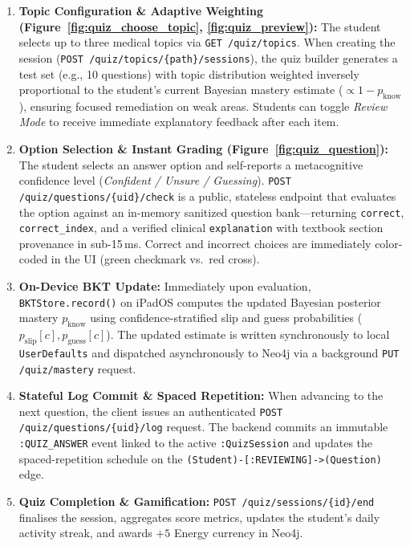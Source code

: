 \begin{enumerate}
    \item \textbf{Topic Configuration \& Adaptive Weighting (Figure~\ref{fig:quiz_choose_topic}, \ref{fig:quiz_preview}):} The student selects up to three medical topics via \texttt{GET /quiz/topics}. When creating the session (\texttt{POST /quiz/topics/\{path\}/sessions}), the quiz builder generates a test set (e.g., 10 questions) with topic distribution weighted inversely proportional to the student's current Bayesian mastery estimate ($\propto 1 - p_{\text{know}}$), ensuring focused remediation on weak areas. Students can toggle \textit{Review Mode} to receive immediate explanatory feedback after each item.
    \item \textbf{Option Selection \& Instant Grading (Figure~\ref{fig:quiz_question}):} The student selects an answer option and self-reports a metacognitive confidence level (\textit{Confident / Unsure / Guessing}). \texttt{POST /quiz/questions/\{uid\}/check} is a public, stateless endpoint that evaluates the option against an in-memory sanitized question bank---returning \texttt{correct}, \texttt{correct\_index}, and a verified clinical \texttt{explanation} with textbook section provenance in sub-15\,ms. Correct and incorrect choices are immediately color-coded in the UI (green checkmark vs.\ red cross).
    \item \textbf{On-Device BKT Update:} Immediately upon evaluation, \texttt{BKTStore.record()} on iPadOS computes the updated Bayesian posterior mastery $p_{\text{know}}$ using confidence-stratified slip and guess probabilities ($p_{\text{slip}}[c], p_{\text{guess}}[c]$). The updated estimate is written synchronously to local \texttt{UserDefaults} and dispatched asynchronously to Neo4j via a background \texttt{PUT /quiz/mastery} request.
    \item \textbf{Stateful Log Commit \& Spaced Repetition:} When advancing to the next question, the client issues an authenticated \texttt{POST /quiz/questions/\{uid\}/log} request. The backend commits an immutable \texttt{:QUIZ\_ANSWER} event linked to the active \texttt{:QuizSession} and updates the spaced-repetition schedule on the \texttt{(Student)-[:REVIEWING]->(Question)} edge.
    \item \textbf{Quiz Completion \& Gamification:} \texttt{POST /quiz/sessions/\{id\}/end} finalises the session, aggregates score metrics, updates the student's daily activity streak, and awards $+5$ Energy currency in Neo4j.
\end{enumerate}

